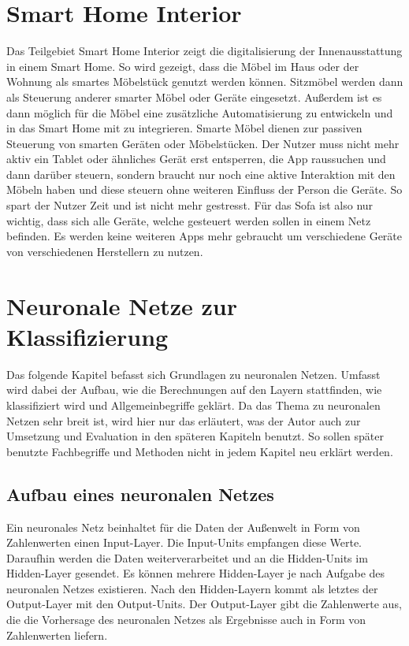 \section{Smart Home Interior}
Das Teilgebiet Smart Home Interior zeigt die digitalisierung der Innenausstattung in einem Smart Home. So wird gezeigt, dass die Möbel im Haus oder der Wohnung als smartes Möbelstück genutzt werden können. Sitzmöbel werden dann als Steuerung anderer smarter Möbel oder Geräte eingesetzt. Außerdem ist es dann möglich für die Möbel eine zusätzliche Automatisierung zu entwickeln und in das Smart Home mit zu integrieren. Smarte Möbel dienen zur passiven Steuerung von smarten Geräten oder Möbelstücken. Der Nutzer muss nicht mehr aktiv ein Tablet oder ähnliches Gerät erst entsperren, die App raussuchen und dann darüber steuern, sondern braucht nur noch eine aktive Interaktion mit den Möbeln haben und diese steuern ohne weiteren Einfluss der Person die Geräte. So spart der Nutzer Zeit und ist nicht mehr gestresst. 
\newline
Für das Sofa ist also nur wichtig, dass sich alle Geräte, welche gesteuert werden sollen in einem Netz befinden. Es werden keine weiteren Apps mehr gebraucht um verschiedene Geräte von verschiedenen Herstellern zu nutzen.

\section{Neuronale Netze zur Klassifizierung}
\label{sec:NNK}
Das folgende Kapitel befasst sich Grundlagen zu neuronalen Netzen. Umfasst wird dabei der Aufbau, wie die Berechnungen auf den Layern stattfinden, wie klassifiziert wird und Allgemeinbegriffe geklärt. Da das Thema zu neuronalen Netzen sehr breit ist, wird hier nur das erläutert, was der Autor auch zur Umsetzung und Evaluation in den späteren Kapiteln benutzt. So sollen später benutzte Fachbegriffe und Methoden nicht in jedem Kapitel neu erklärt werden.

\subsection{Aufbau eines neuronalen Netzes}
Ein neuronales Netz beinhaltet für die Daten der Außenwelt in Form von Zahlenwerten einen Input-Layer. Die Input-Units empfangen diese Werte. Daraufhin werden die Daten weiterverarbeitet und an die Hidden-Units im Hidden-Layer gesendet. Es können mehrere Hidden-Layer je nach Aufgabe des neuronalen Netzes existieren. Nach den Hidden-Layern kommt als letztes der Output-Layer mit den Output-Units. Der Output-Layer gibt die Zahlenwerte aus, die die Vorhersage des neuronalen Netzes als Ergebnisse auch in Form von Zahlenwerten liefern.

